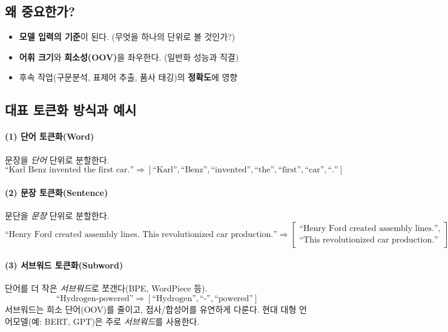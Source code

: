 \documentclass[12pt]{article}
\begin{document}
\subsection{왜 중요한가?}
\begin{itemize}
  \item \textbf{모델 입력의 기준}이 된다. (무엇을 하나의 단위로 볼 것인가?)
  \item \textbf{어휘 크기}와 \textbf{희소성(OOV)}을 좌우한다. (일반화 성능과 직결)
  \item 후속 작업(구문분석, 표제어 추출, 품사 태깅)의 \textbf{정확도}에 영향
\end{itemize}

\subsection{대표 토큰화 방식과 예시}
\paragraph{(1) 단어 토큰화(Word)}
문장을 \emph{단어} 단위로 분할한다.
\[
\text{``Karl Benz invented the first car.''}
\Rightarrow [\text{``Karl''}, \text{``Benz''}, \text{``invented''}, \text{``the''}, \text{``first''}, \text{``car''}, \text{``.''}]
\]

\paragraph{(2) 문장 토큰화(Sentence)}
문단을 \emph{문장} 단위로 분할한다.
\[
\text{``Henry Ford created assembly lines. This revolutionized car production.''}
\Rightarrow
\begin{bmatrix}
\text{``Henry Ford created assembly lines.''},\\
\text{``This revolutionized car production.''}
\end{bmatrix}
\]

\paragraph{(3) 서브워드 토큰화(Subword)}
단어를 더 작은 \emph{서브워드}로 쪼갠다(BPE, WordPiece 등).
\[
\text{``Hydrogen-powered''}
\Rightarrow [\text{``Hydrogen''}, \text{``-''}, \text{``powered''}]
\]
서브워드는 희소 단어(OOV)를 줄이고, 접사/합성어를 유연하게 다룬다. 현대 대형 언어모델(예: BERT, GPT)은 주로 \emph{서브워드}를 사용한다.
\end{document}
